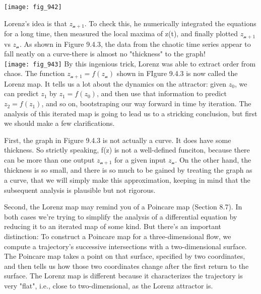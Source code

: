 \documentclass{article}
\newcommand\tab[1][1cm]{\hspace*{#1}}
\begin{document}
\texttt{[image: fig\_942]}

Lorenz's idea is that $z_{\mathcal{n}+1}$. To check this, he numerically integrated the equations for a long time, then measured the local maxima of z(t), and finally plotted $z_{\mathcal{n}+1}$ vs $z_{\mathcal{n}}$. As shown in Figure 9.4.3, the data from the chaotic time series appear to fall neatly on a curve-there is almost no "thickness" to the graph! \\

\texttt{[image: fig\_943]}
\tab By this ingenious trick, Lorenz was able to extract order from chaos. The function $z_{\mathcal{n}+1}=f(z_{\mathcal{n}})$ shown in FIgure 9.4.3 is now called the Lorenz map. It tells us a lot about the dynamics on the attractor: given $z_{0}$, we can predict $z_{1}$ by $z_{1}=f(z_{0})$, and then use that information to predict $z_{2}=f(z_{1})$, and so on, bootstraping our way forward in time by iteration. The analysis of this iterated map is going to lead us to a stricking conclusion, but first we should make a few clarifications. \\ \tab

First, the graph in Figure 9.4.3 is not actually a curve. It does have some thickness. So strictly speaking, f(z) is not a well-defined funciton, because there can be more than one output $z_{\mathcal{n}+1}$ for a given input $z_{\mathcal{n}}$. On the other hand, the thickness is so small, and there is so much to be gained by treating the graph as a curve, that we will simply make this approximation, keeping in mind that the subsequent analysis is plausible but not rigorous. \\ \tab

Second, the Lorenz map may remind you of a Poincare map (Section 8.7). In both cases we're trying to simplify the analysis of a differential equation by reducing it to an iterated map of some kind. But there's an important distinction: To construct a Poincare map for a three-dimensional flow, we compute a trajectory's successive intersections with a two-dimensional surface. The Poincare map takes a point on that surface, specified by two coordinates, and then tells us how those two coordinates change after the first return to the surface. The Lorenz map is different because it characterizes the trajectory is very "flat", i.e., close to two-dimensional, as the Lorenz attractor is. 
\end{document}
